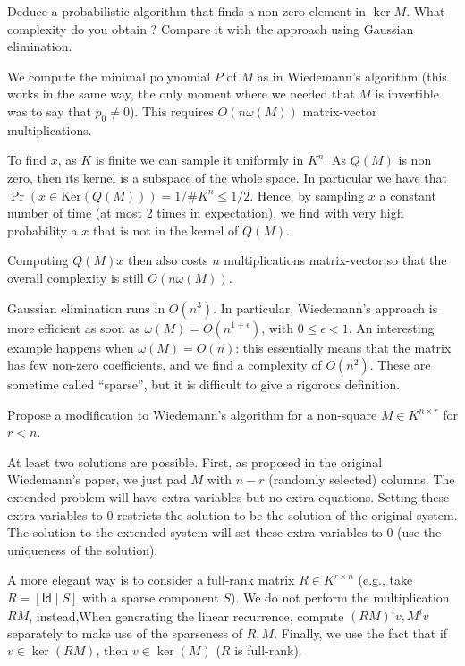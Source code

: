 \documentclass[11pt]{exam}
\theoremstyle{definition}
\begin{document}
{\begin{questions}
        \question Deduce a probabilistic algorithm that finds a non zero element in $\ker M$. What complexity do you obtain ? Compare it with the approach using Gaussian elimination.
	
	\begin{solution}
          We compute the minimal polynomial $P$ of $M$ as in Wiedemann's algorithm (this works in the same way, the only moment where we needed that $M$ is invertible was to say that $p_0 \neq 0$). This requires $O(n\omega(M))$ matrix-vector multiplications.

          To find $x$, as $K$ is finite we can sample it uniformly in $K^n$. As $Q(M)$ is non zero, then its  kernel is a subspace of the whole space. In particular we have that $\Pr(x \in \text{Ker}(Q(M)) ) = 1/\#K^n \leq 1/2$. Hence, by sampling $x$ a constant number of time (at most 2 times in expectation), we find with very high probability a $x$ that is not in the kernel of $Q(M)$.
          
          Computing $Q(M)x$ then also costs $n$ multiplications matrix-vector,so that the overall complexity is still $O(n \omega(M))$.

          Gaussian elimination runs in $O(n^3)$. In particular, Wiedemann's approach is more efficient as soon as $\omega(M)=O(n^{1+\epsilon})$, with $0\leq \epsilon<1$. An interesting example happens when $\omega(M)=O(n)$: this essentially means that the matrix has few non-zero coefficients, and we find a complexity of $O(n^2)$. These are sometime called ``sparse'', but it is difficult to give a rigorous definition. 
        \end{solution}
          \question Propose a modification to Wiedemann's algorithm for a non-square $M \in K^{n \times r}$ for $r < n$.
          \begin{solution}
				At least two solutions are possible. First, as proposed in the original Wiedemann's paper, we just pad $M$ with $n-r$ (randomly selected) columns.  The extended problem will have extra variables but no extra equations. Setting these extra variables to $0$ restricts the solution to be the solution of the original system. The solution to the extended system will set these extra variables to $0$ (use the uniqueness of the solution).
				
				A more elegant way is to consider a full-rank matrix $R \in K^{r \times n}$ (e.g., take $R = [\mathsf{Id} \; |\; S ]$ with a sparse component $S$). We do not perform the multiplication $RM$, instead,When generating the linear recurrence, compute $(RM)^i v, M^i v$ separately to make use of the sparseness of $R, M$. Finally, we use the fact that if $v \in \ker(RM)$, then $v \in \ker(M)$ ($R$ is full-rank).
		\end{solution}
	

\end{questions}}
\end{document}
